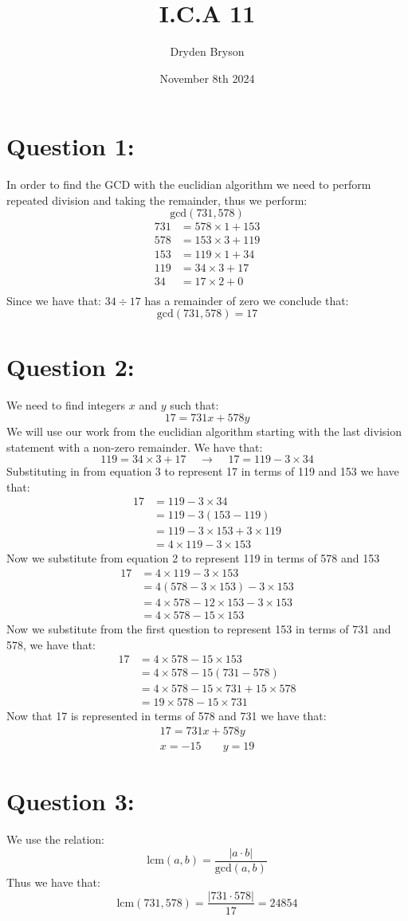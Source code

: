 \documentclass{article}
\title{I.C.A 11}
\author{Dryden Bryson}
\date{November 8th 2024}
\begin{document}
\maketitle
\section*{Question 1:}
In order to find the GCD with the euclidian algorithm we need to perform repeated division and taking the remainder, thus we perform:
$$\text{gcd}(731,578)$$
$$\begin{aligned}
    731&=578\times 1+153\\
    578&=153\times 3+119\\
    153&=119\times 1+34\\
    119&=34\times 3+17\\
    34&=17\times 2+0\\
\end{aligned}$$
Since we have that: $34 \div 17$ has a remainder of zero we conclude that: $$\text{gcd}(731,578)=17$$
\section*{Question 2:}
We need to find integers $x$ and $y$ such that: $$17=731x+578y$$
We will use our work from the euclidian algorithm starting with the last division statement with a non-zero remainder. We have that: $$119=34\times 3+17 \;\;\;\;\rightarrow\;\;\;\; 17= 119-3\times 34$$
Substituting in from equation 3 to represent 17 in terms of 119 and 153 we have that: 
$$\begin{aligned}
    17&= 119-3\times 34\\
    &=119-3(153-119)\\
    &=119-3\times 153+3\times 119 \\
    &=4\times 119-3\times 153
\end{aligned}$$
Now we substitute from equation 2 to represent 119 in terms of 578 and 153
$$\begin{aligned}
    17 &=4\times 119-3\times 153\\
    &=4(578-3\times 153)-3\times 153\\
    &= 4\times 578-12\times 153-3\times 153\\
    &=4\times 578 -15\times 153
\end{aligned}$$
Now we substitute from the first question to represent 153 in terms of 731 and 578, we have that:
$$\begin{aligned}
    17 &=4\times 578 -15\times 153\\
    &= 4\times 578-15(731-578)\\
    &= 4\times 578-15\times 731+15\times 578\\
    &= 19\times 578-15\times 731
\end{aligned}$$
Now that 17 is represented in terms of 578 and 731 we have that: $$\begin{aligned}
    17=731x+578y\\
    x=-15\;\;\;\;\;\;\;y=19
\end{aligned}$$
\section*{Question 3:}
We use the relation: $$\text{lcm}(a,b)=\frac{|a\cdot b|}{\text{gcd}(a,b)}$$
Thus we have that: $$\text{lcm}(731,578)=\frac{|731\cdot 578|}{17}=24854$$
\end{document}
